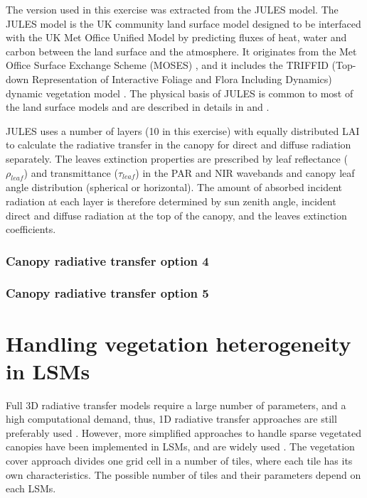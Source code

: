 \documentclass[a4paper,11pt]{report}
\begin{document}
The version used in this exercise was extracted from the JULES model. The JULES model is the UK community land surface model designed to be interfaced with the UK Met Office Unified Model \citep{Walters2014} by predicting fluxes of heat, water and carbon between the land surface and the atmosphere. It originates from the Met Office Surface Exchange Scheme (MOSES) \citep{Cox1999}, and it includes the TRIFFID (Top-down Representation of Interactive Foliage and Flora Including Dynamics) dynamic vegetation model \citep{Cox2001}. The physical basis of JULES is common to most of the land surface models and are described in details in \citet{Best2011} and \citet{Clark2011}.

JULES uses a number of layers (10 in this exercise) with equally distributed LAI to calculate the radiative transfer in the canopy for direct and diffuse radiation separately. The leaves extinction properties are prescribed by leaf reflectance ($\rho_{leaf}$) and transmittance ($\tau_{leaf}$) in the PAR and NIR wavebands and canopy leaf angle distribution (spherical or horizontal). The amount of absorbed incident radiation at each layer is therefore determined by sun zenith angle, incident direct and diffuse radiation at the top of the canopy, and the leaves extinction coefficients.

\subsubsection{Canopy radiative transfer option 4}

\subsubsection{Canopy radiative transfer option 5}

\section{Handling vegetation heterogeneity in LSMs}
Full 3D radiative transfer models require a large number of parameters, and a high computational demand, thus, 1D radiative transfer approaches are still preferably used \citep{yang2003,loew2014}. However, more simplified approaches to handle sparse vegetated canopies have been implemented in LSMs, and are widely used \citep{loew2014}. The vegetation cover approach divides one grid cell in a number of tiles, where each tile has its own characteristics. The possible number of tiles and their parameters depend on each LSMs.
\end{document}
